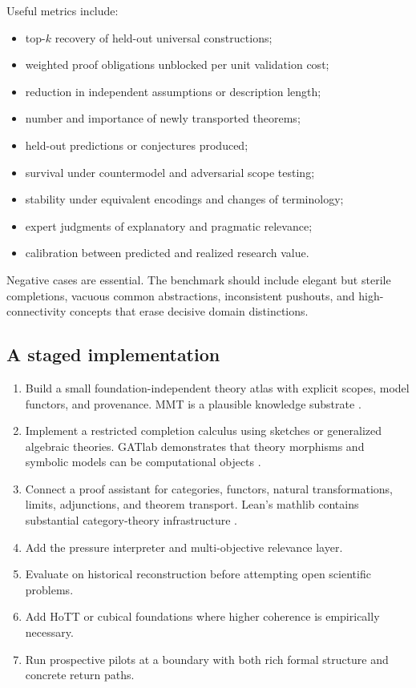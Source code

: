 \documentclass[11pt]{article}
\begin{document}
Useful metrics include:
\begin{itemize}
  \item top-$k$ recovery of held-out universal constructions;
  \item weighted proof obligations unblocked per unit validation cost;
  \item reduction in independent assumptions or description length;
  \item number and importance of newly transported theorems;
  \item held-out predictions or conjectures produced;
  \item survival under countermodel and adversarial scope testing;
  \item stability under equivalent encodings and changes of terminology;
  \item expert judgments of explanatory and pragmatic relevance;
  \item calibration between predicted and realized research value.
\end{itemize}

Negative cases are essential. The benchmark should include elegant but sterile completions, vacuous
common abstractions, inconsistent pushouts, and high-connectivity concepts that erase decisive domain
distinctions.

\subsection{A staged implementation}

\begin{enumerate}
  \item Build a small foundation-independent theory atlas with explicit scopes, model functors, and
  provenance. MMT is a plausible knowledge substrate \cite{rabe2016}.
  \item Implement a restricted completion calculus using sketches or generalized algebraic theories.
  GATlab demonstrates that theory morphisms and symbolic models can be computational objects
  \cite{gatlab}.
  \item Connect a proof assistant for categories, functors, natural transformations, limits, adjunctions,
  and theorem transport. Lean's mathlib contains substantial category-theory infrastructure
  \cite{leanmathlib}.
  \item Add the pressure interpreter and multi-objective relevance layer.
  \item Evaluate on historical reconstruction before attempting open scientific problems.
  \item Add HoTT or cubical foundations where higher coherence is empirically necessary.
  \item Run prospective pilots at a boundary with both rich formal structure and concrete return paths.
\end{enumerate}
\end{document}
